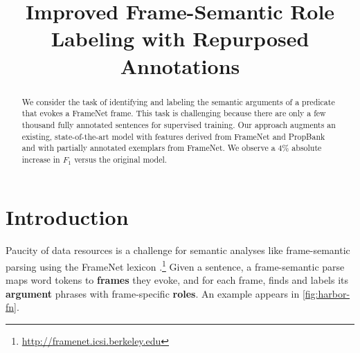 \documentclass[11pt,a4paper]{article}
\title{Improved Frame-Semantic Role Labeling with Repurposed Annotations}
\newcommand{\ensuretext}[1]{#1}
\newcommand{\nssmarker}{\ensuretext{\textcolor{magenta}{\ensuremath{^{\textsc{NS}}_{\textsc{S}}}}}}
\newcommand{\mkmarker}{\ensuretext{\textcolor{red}{\ensuremath{^{\textsc{M}}_{\textsc{K}}}}}}
\newcommand{\stmarker}{\ensuretext{\textcolor{blue}{\ensuremath{^{\textsc{S}}_{\textsc{T}}}}}}
\newcommand{\arkcomment}[3]{\ensuretext{\textcolor{#3}{[#1 #2]}}}
\newcommand{\nss}[1]{\arkcomment{\nssmarker}{#1}{magenta}}
\newcommand{\mk}[1]{\arkcomment{\mkmarker}{#1}{red}}
\newcommand{\st}[1]{\arkcomment{\stmarker}{#1}{blue}}
\begin{document}
\maketitle
\begin{abstract}
We consider the task of identifying and labeling the semantic
arguments of a predicate that evokes a FrameNet frame.  This task is
challenging because there are only a few thousand fully annotated
sentences for supervised training.  Our approach augments an existing, state-of-the-art
model with features derived from FrameNet and PropBank and with
partially annotated exemplars from FrameNet.  We observe a 4\% absolute increase in $F_1$ 
versus the original model.

\end{abstract}

\section{Introduction}

Paucity of data resources is a challenge for semantic analyses like
frame-semantic parsing \citep{gildea-02,das-14} using the
FrameNet lexicon \citep{baker-98}.\footnote{\url{http://framenet.icsi.berkeley.edu}}
Given a sentence, a frame-semantic parse maps word tokens
to \textbf{frames} they evoke, and for each frame, finds and labels
its \textbf{argument} phrases  
with frame-specific \textbf{roles}. 
An example appears in \cref{fig:harbor-fn}. %
\end{document}
